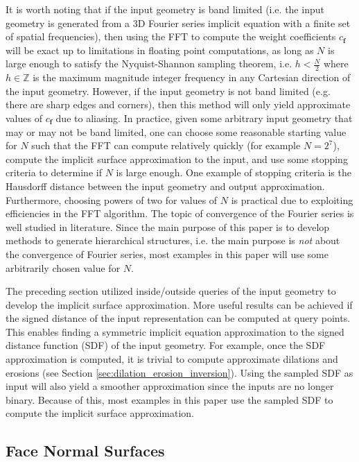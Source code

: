\documentclass[acmtog]{acmart}
\begin{document}
It is worth noting that if the input geometry is band limited (i.e. the input geometry is generated from a 3D Fourier series implicit equation with a finite set of spatial frequencies), then using the FFT to compute the weight coefficients $c_{\mathbf{f}}$ will be exact up to limitations in floating point computations, as long as $N$ is large enough to satisfy the Nyquist-Shannon sampling theorem, i.e. $h < \frac{N}{2}$ where $h \in \mathbb{Z}$ is the maximum magnitude integer frequency in any Cartesian direction of the input geometry. However, if the input geometry is not band limited (e.g. there are sharp edges and corners), then this method will only yield approximate values of $c_{\mathbf{f}}$ due to aliasing. In practice, given some arbitrary input geometry that may or may not be band limited, one can choose some reasonable starting value for $N$ such that the FFT can compute relatively quickly (for example $N = 2^7$), compute the implicit surface approximation to the input, and use some stopping criteria to determine if $N$ is large enough. One example of stopping criteria is the Hausdorff distance between the input geometry and output approximation. Furthermore, choosing powers of two for values of $N$ is practical due to exploiting efficiencies in the FFT algorithm. The topic of convergence of the Fourier series is well studied in literature. Since the main purpose of this paper is to develop methods to generate hierarchical structures, i.e. the main purpose is \textit{not} about the convergence of Fourier series, most examples in this paper will use some arbitrarily chosen value for $N$.

The preceding section utilized inside/outside queries of the input geometry to develop the implicit surface approximation. More useful results can be achieved if the signed distance of the input representation can be computed at query points. This enables finding a symmetric implicit equation approximation to the signed distance function (SDF) of the input geometry. For example, once the SDF approximation is computed, it is trivial to compute approximate dilations and erosions (see Section \ref{sec:dilation_erosion_inversion}). Using the sampled SDF as input will also yield a smoother approximation since the inputs are no longer binary. Because of this, most examples in this paper use the sampled SDF to compute the implicit surface approximation.

\subsection{Face Normal Surfaces}
\label{sec:face_normal_surfaces}
\end{document}
